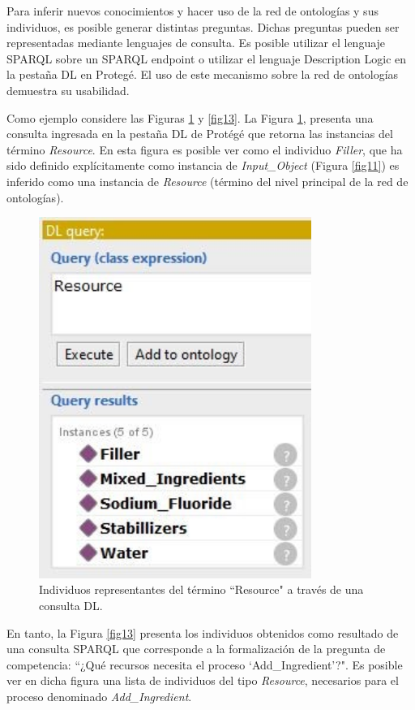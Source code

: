 \documentclass[journal]{IEEEtran}
\begin{document}
Para inferir nuevos conocimientos y hacer uso de la red de ontolog\'ias y sus individuos, es posible generar distintas preguntas. Dichas preguntas pueden ser representadas mediante lenguajes de consulta. Es posible utilizar el lenguaje SPARQL sobre un SPARQL endpoint o utilizar el lenguaje Description Logic en la pestaña DL en Proteg\'e. El uso de este mecanismo sobre la red de ontolog\'ias demuestra su usabilidad. 

Como ejemplo considere las Figuras \ref{fig12} y \ref{fig13}. La Figura \ref{fig12}, presenta una consulta ingresada en la pestaña DL de Prot\'eg\'e que retorna las instancias del t\'ermino \emph{Resource}. En esta figura es posible ver como el individuo \emph{Filler}, que ha sido definido expl\'icitamente como instancia de \emph{Input\_Object} (Figura \ref{fig11}) es inferido como una instancia de \emph{Resource} (t\'ermino del nivel principal de la red de ontolog\'ias).


\begin{figure}[!t]
\centering
\includegraphics[width=3.5in]{figures/figure12.jpg}
\caption{Individuos representantes del t\'ermino ``Resource" a trav\'es de una consulta DL.}
\label{fig12}
\end{figure}

En tanto, la Figura \ref{fig13} presenta los individuos obtenidos como resultado de una consulta SPARQL que corresponde a la formalizaci\'on de la pregunta de competencia: ``¿Qu\'e recursos necesita el proceso ‘Add\_Ingredient’?". Es posible ver en dicha figura una lista de individuos del tipo \emph{Resource}, necesarios para el proceso denominado \emph{Add\_Ingredient}.
\end{document}
